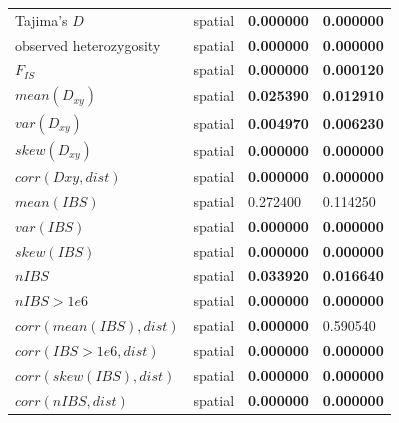 \documentclass[10pt,twoside,lineno,hidelinks]{preprint} %
\providecommand{\DIFaddbegin}{} %
\providecommand{\DIFaddend}{} %
\begin{document}
\begin{table}[htbp]
\begin{tableminipage}{\textwidth}
\begin{tabularx}{\textwidth}{XXXX}
Tajima's $D$ & spatial & \textbf{0.000000} & \textbf{0.000000} \\ 
observed heterozygosity & spatial & \textbf{0.000000} & \textbf{0.000000} \\ 
$F_{IS}$ & spatial & \textbf{0.000000} & \textbf{0.000120} \\ 
$mean(D_{xy})$ & spatial & \textbf{0.025390} & \textbf{0.012910} \\ 
$var(D_{xy})$ & spatial & \textbf{0.004970} & \textbf{0.006230} \\ 
$skew(D_{xy})$ & spatial & \textbf{0.000000} & \textbf{0.000000} \\ 
$corr(Dxy,dist)$ & spatial & \textbf{0.000000} & \textbf{0.000000} \\ 
$mean(IBS)$ & spatial & 0.272400 & 0.114250 \\ 
$var(IBS)$ & spatial & \textbf{0.000000} & \textbf{0.000000} \\ 
$skew(IBS)$ & spatial & \textbf{0.000000} & \textbf{0.000000} \\ 
$nIBS$ & spatial & \textbf{0.033920} & \textbf{0.016640} \\ 
$nIBS>1e6$ & spatial & \textbf{0.000000} & \textbf{0.000000} \\ 
$corr(mean(IBS),dist)$ & spatial & \textbf{0.000000} & 0.590540 \\ 
$corr(IBS>1e6,dist)$ & spatial & \textbf{0.000000} & \textbf{0.000000} \\ 
$corr(skew(IBS),dist)$ & spatial & \textbf{0.000000} & \textbf{0.000000} \\ 
$corr(nIBS,dist)$ & spatial & \textbf{0.000000} & \textbf{0.000000} \\ 
\hline
\end{tabularx}
\end{tableminipage}
\label{table:sampling}
\end{table}
\DIFaddbegin \FloatBarrier
\DIFaddend 
\end{document}
